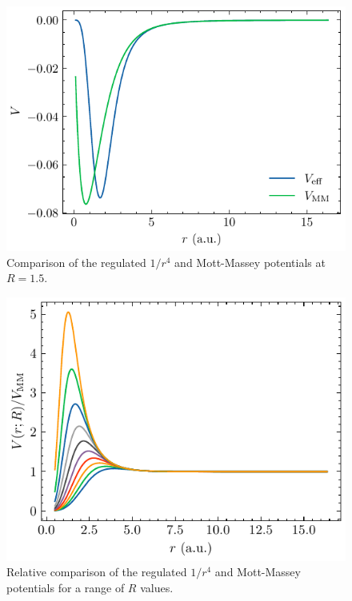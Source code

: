 \documentclass{article}
\begin{document}
\begin{figure}
  \centering
  \includegraphics[width=\linewidth]{figures/V_comparison.pdf}
  \caption{Comparison of the regulated $1/r^4$ and Mott-Massey
potentials at $R=1.5$.}\label{fig:V_comparison}
\end{figure}

\begin{figure}
  \centering
  \includegraphics[width=\linewidth]{figures/V_rel_comparison.pdf}
\caption{Relative comparison of the regulated $1/r^4$ and Mott-Massey
potentials for a range of $R$ values.}\label{fig:V_rel_comparison}

\end{figure}
\end{document}
